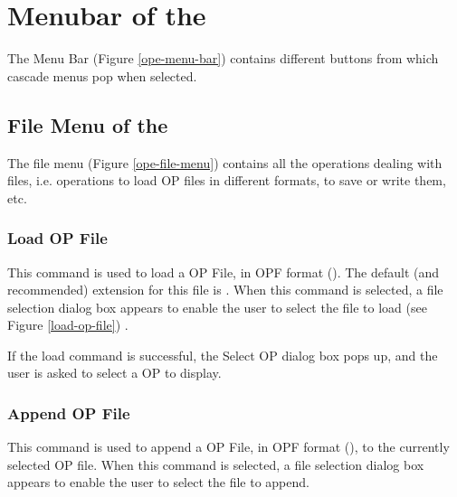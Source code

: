 \section{Menubar of the \OPE{}}


The Menu Bar (Figure \ref{ope-menu-bar}) contains different buttons from
which cascade menus pop when selected.



\subsection{File Menu of the \OPE{}}


The file menu (Figure \ref{ope-file-menu}) contains all the operations dealing
with files, i.e. operations to load OP files in different formats, to save or
write them, etc.



\subsubsection{Load OP File}


This command is used to load a OP File, in OPF format ().
The default (and recommended) extension for this file is  .  When
this command is selected, a file selection dialog box appears to enable the
user to select the file to load (see Figure \ref{load-op-file}) .

If the load command is successful, the Select OP dialog box pops up,
and the user is asked to select a OP to display.

\subsubsection{Append OP File}

This command is used to append a OP File, in OPF format (),
to the currently selected OP file. When this command is selected, a file
selection dialog box appears to enable the user to select the file to append.

